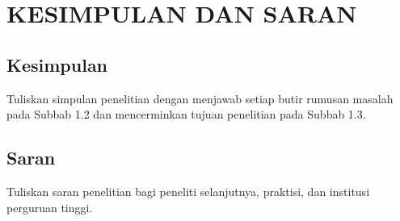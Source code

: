 %
\chapter{KESIMPULAN DAN SARAN}


\section{Kesimpulan}

Tuliskan simpulan penelitian dengan menjawab setiap butir rumusan masalah
pada Subbab 1.2 dan mencerminkan tujuan penelitian pada Subbab 1.3.

\section{Saran}

Tuliskan saran penelitian bagi peneliti selanjutnya, praktisi, dan
institusi perguruan tinggi.